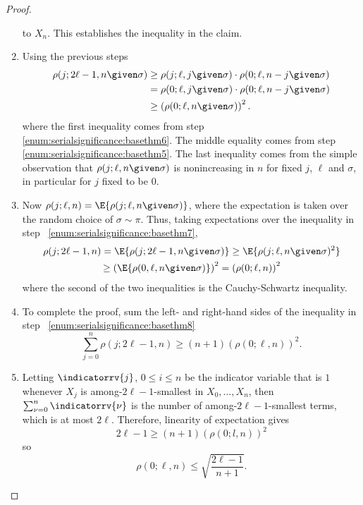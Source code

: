 \documentclass[12pt]{article}
\begin{document}
\begin{proof}
\begin{enumerate}
            to \( X_n \).
            This establishes the inequality in the claim.
        \item
            \label{enum:serialsignificance:basethm7} Using the previous
            steps
            \begin{align*}
                \rho(j; 2\ell-1, n \given \sigma) &\ge \rho(j; \ell, j
                \given \sigma) \cdot \rho(0; \ell, n-j \given \sigma) \\
                &= \rho(0; \ell, j \given \sigma) \cdot \rho(0; \ell,
                n-j \given \sigma) \\
                &\ge \left( \rho(0; \ell, n \given \sigma) \right)^2.
            \end{align*}
            where the first inequality comes from step~%
            \ref{enum:serialsignificance:basethm6}.  The middle equality
            comes from step~%
            \ref{enum:serialsignificance:basethm5}.  The last inequality
            comes from the simple observation that \( \rho(j; \ell, n
            \given \sigma) \) is nonincreasing in \( n \) for fixed \( j
            \), \( \ell \) and \( \sigma \), in particular for \( j \)
            fixed to be \( 0 \).
        \item
            \label{enum:serialsignificance:basethm8} Now \( \rho(j;\ell,n)
            = \E{\rho(j; \ell, n \given \sigma)} \), where the expectation
            is taken over the random choice of \( \sigma \sim \pi \). Thus,
            taking expectations over the inequality in step~%
            \ref{enum:serialsignificance:basethm7},
            \begin{multline}
                \rho(j; 2\ell -1, n) = \E{\rho(j; 2\ell - 1, n \given \sigma)}
                \ge \E{\rho(j; \ell, n \given \sigma)^2} \\
                \ge \left( \E{\rho(0, \ell, n \given \sigma)}\right)^2 =
                \left( \rho(0; \ell, n) \right)^2
            \end{multline}
            where the second of the two inequalities is the
            Cauchy-Schwartz inequality.
        \item
            To complete the proof, sum the left- and right-hand sides of
            the inequality in step~%
            \ref{enum:serialsignificance:basethm8}
            \[
                \sum\limits_{j=0}^n \rho(j; 2\ell - 1, n) \ge (n+1) (\rho(0;
                \ell, n))^2.
            \]
        \item
            Letting \( \indicatorrv{j} \), \( 0 \le i \le n \) be the indicator
            variable that is \( 1 \) whenever \( X_j \) is among-\(
            2\ell -1 \)-smallest in \( X_0, \dots , X_n \), then \( \sum_{\nu=0}^n
            \indicatorrv{\nu} \) is the number of among-\( 2\ell - 1 \)-smallest
            terms, which is at most \( 2\ell  \).  Therefore,
            linearity of expectation gives
            \[
                2\ell - 1 \ge (n + 1)(\rho(0; l,n) )^2
            \] so
            \[
                \rho(0; \ell, n) \le \sqrt{ \frac{2\ell - 1}{n+1}}.
            \]
    \end{enumerate}
\end{proof}
\end{document}
